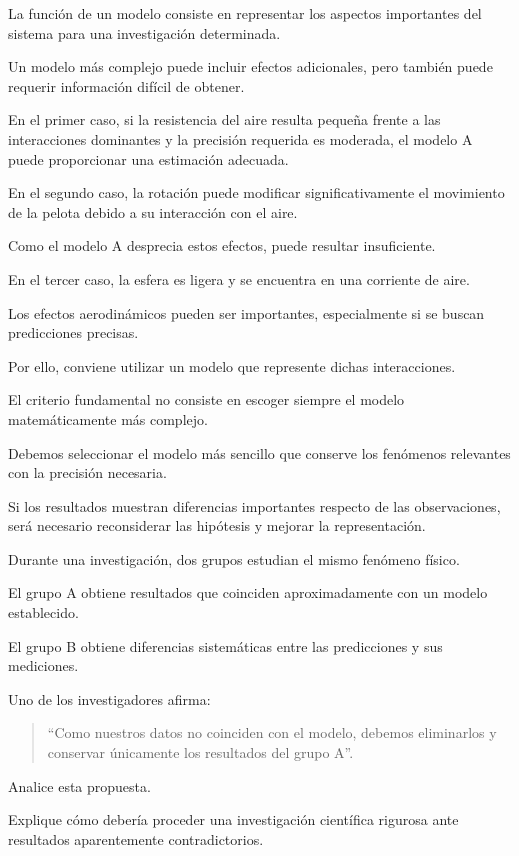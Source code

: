 \begin{explicacion}
La función de un modelo consiste en representar los aspectos importantes del sistema para una investigación determinada.

Un modelo más complejo puede incluir efectos adicionales, pero también puede requerir información difícil de obtener.

En el primer caso, si la resistencia del aire resulta pequeña frente a las interacciones dominantes y la precisión requerida es moderada, el modelo A puede proporcionar una estimación adecuada.

En el segundo caso, la rotación puede modificar significativamente el movimiento de la pelota debido a su interacción con el aire.

Como el modelo A desprecia estos efectos, puede resultar insuficiente.

En el tercer caso, la esfera es ligera y se encuentra en una corriente de aire.

Los efectos aerodinámicos pueden ser importantes, especialmente si se buscan predicciones precisas.

Por ello, conviene utilizar un modelo que represente dichas interacciones.

El criterio fundamental no consiste en escoger siempre el modelo matemáticamente más complejo.

Debemos seleccionar el modelo más sencillo que conserve los fenómenos relevantes con la precisión necesaria.

Si los resultados muestran diferencias importantes respecto de las observaciones, será necesario reconsiderar las hipótesis y mejorar la representación.
\end{explicacion}


\begin{ejercicio}
Durante una investigación, dos grupos estudian el mismo fenómeno físico.

El grupo A obtiene resultados que coinciden aproximadamente con un modelo establecido.

El grupo B obtiene diferencias sistemáticas entre las predicciones y sus mediciones.

Uno de los investigadores afirma:

\begin{quote}
``Como nuestros datos no coinciden con el modelo, debemos eliminarlos y conservar únicamente los resultados del grupo A''.
\end{quote}

Analice esta propuesta.

Explique cómo debería proceder una investigación científica rigurosa ante resultados aparentemente contradictorios.
\end{ejercicio}

